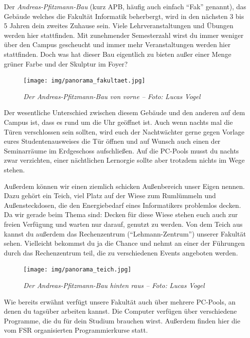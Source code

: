 
Der \emph{Andreas-Pfitzmann-Bau} (kurz APB, häufig auch einfach \enquote{Fak} genannt), das Gebäude welches die Fakultät Informatik beherbergt, wird in den nächsten 3 bis 5 Jahren dein zweites Zuhause sein.
Viele Lehrveranstaltungen und Übungen werden hier stattfinden. Mit zunehmender Semesterzahl wirst du immer weniger über den Campus gescheucht und immer mehr Veranstaltungen werden hier stattfinden.
Doch was hat dieser Bau eigentlich zu bieten außer einer Menge grüner Farbe und der Skulptur im Foyer?

\begin{figure}[h!]
\centering
\texttt{[image: img/panorama\_fakultaet.jpg]}
\caption*{\small \textit{Der Andreas-Pfitzmann-Bau von vorne -- Foto: Lucas Vogel}}
\end{figure}

Der wesentliche Unterschied zwischen diesem Gebäude und den anderen auf dem Campus ist, dass es rund um die Uhr geöffnet ist. Auch wenn nachts mal die Türen verschlossen sein sollten, wird euch der Nachtwächter gerne gegen Vorlage eures Studentenausweises die Tür öffnen und auf Wunsch auch einen der Seminarräume im Erdgeschoss aufschließen.
Auf die PC-Pools musst du nachts zwar verzichten, einer nächtlichen Lernorgie sollte aber trotzdem nichts im Wege stehen.

Außerdem können wir einen ziemlich schicken Außenbereich unser Eigen nennen. Dazu gehört ein Teich, viel Platz auf der Wiese zum Rumlümmeln und Außensteckdosen, die den Energiebedarf eines Informatikers problemlos decken. Da wir gerade beim Thema sind: Decken für diese Wiese stehen euch auch zur freien Verfügung und warten nur darauf, genutzt zu werden.
Von dem Teich aus kannst du außerdem das Rechenzentrum (\enquote{Lehmann-Zentrum}) unserer Fakultät sehen. Vielleicht bekommst du ja die Chance und nehmt an einer der Führungen durch das Rechenzentrum teil, die zu verschiedenen Events angeboten werden.

\pagebreak

\begin{figure}[t]
    \centering
    \texttt{[image: img/panorama\_teich.jpg]}
    \caption*{\small \textit{Der Andreas-Pfitzmann-Bau hinten raus -- Foto: Lucas Vogel}}
\end{figure}

Wie bereits erwähnt verfügt unsere Fakultät auch über mehrere PC-Pools, an denen du tagsüber arbeiten kannst. Die Computer verfügen über verschiedene Programme, die du für dein Studium brauchen wirst. Außerdem finden hier die vom FSR organisierten Programmierkurse statt.

